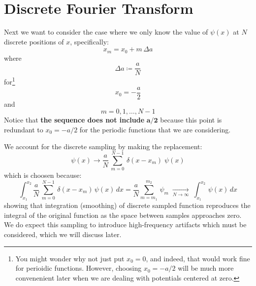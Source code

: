 \documentclass[12pt]{article}
\begin{document}
\section{Discrete Fourier Transform}

Next we want to consider the case where we only know the value of $\psi(x)$ at $N$ discrete positions of $x$, specifically:
$$x_m = x_0 + m \, \Delta a$$
where
$$\Delta a \coloneqq \frac{a}{N}$$
for\footnote{You might wonder why not just put $x_0=0$, and indeed,
that would work fine for perioidic functions.  However, choosing $x_0
= -a/2$ will be much more convenenient later when we are dealing with
potentials centered at zero.}
$$x_0=-\frac{a}{2}$$
and
$$m=0,1,\ldots,N-1$$
Notice that {\bf the sequence does not include} $\mathbf{a/2}$ because this point is redundant to $x_0=-a/2$ for the periodic functions that we are
considering.

We account for the discrete sampling by making the replacement:
$$\psi(x) \to \frac{a}{N} \, \sum_{m=0}^{N-1} \, \delta(x-x_m)  \; \psi(x)$$
which is choosen because:
$$\int_{x_1}^{x_2} \frac{a}{N} \, \sum_{m=0}^{N-1} \, \delta(x-x_m)  \, \psi(x) \, dx = \frac{a}{N} \sum_{m=m_1}^{m_2}  \,\psi_m \; \xrightarrow[N \to \infty]{} \; \int_{x_1}^{x_2} \, \psi(x) \, dx $$
showing that integration (smoothing) of discrete sampled function
reproduces the integral of the original function as the space between
samples approaches zero.  We do expect this sampling to introduce
high-frequency artifacts which must be considered, which we will
discuss later.
\end{document}
